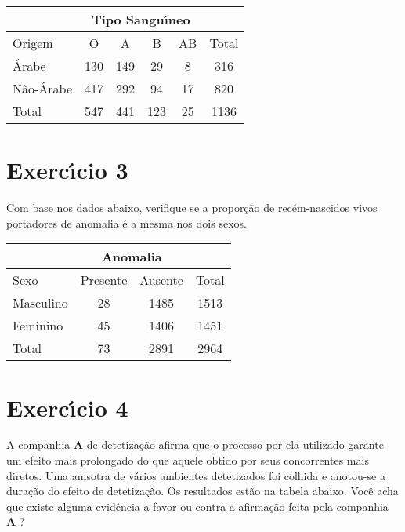 \documentclass[a4paper,11pt,twoside,openright]{report}
\begin{document}
\begin{center}
\begin{tabular}{l|llll|l}
\hline
\multicolumn{1}{l}{} & \multicolumn{4}{c}{Tipo Sangu\'{\i}neo} &  \\ 
\hline
Origem & \multicolumn{1}{c}{O} & \multicolumn{1}{c}{A} & \multicolumn{1}{c}{B} & \multicolumn{1}{c|}{AB} & \multicolumn{1}{c}{Total} \\ 
\hline
\'{A}rabe & \multicolumn{1}{c}{130} & \multicolumn{1}{c}{149} & \multicolumn{1}{c}{29} & \multicolumn{1}{c|}{8} & \multicolumn{1}{c}{316} \\ 
N\~{a}o-\'{A}rabe & \multicolumn{1}{c}{417} & \multicolumn{1}{c}{292} & \multicolumn{1}{c}{94} & \multicolumn{1}{c|}{17} & \multicolumn{1}{c}{820} \\ 
\hline
Total & \multicolumn{1}{c}{547} & \multicolumn{1}{c}{441} & \multicolumn{1}{c}{123} & \multicolumn{1}{c|}{25} & \multicolumn{1}{c}{1136} \\ 
\hline
\end{tabular}
\end{center}
 

\section*{Exerc\'{\i}cio 3} 
\hspace{0.5cm}Com base nos dados abaixo, verifique se a propor\c{c}\~{a}o de rec\'{e}m-nascidos vivos portadores de anomalia \'{e} a mesma nos dois sexos.

\begin{center}
\begin{tabular}{l|ll|l}
\hline
\multicolumn{1}{l}{} & \multicolumn{2}{c}{Anomalia} &  \\ 
\hline
Sexo & \multicolumn{1}{c}{Presente} & \multicolumn{1}{c|}{Ausente} & \multicolumn{1}{c}{Total} \\ 
\hline
Masculino & \multicolumn{1}{c}{28} & \multicolumn{1}{c|}{1485} & \multicolumn{1}{c}{1513} \\ 
Feminino & \multicolumn{1}{c}{45} & \multicolumn{1}{c|}{1406} & \multicolumn{1}{c}{1451} \\ 
\hline
Total & \multicolumn{1}{c}{73} & \multicolumn{1}{c|}{2891} & \multicolumn{1}{c}{2964} \\ 
\hline
\end{tabular}
\end{center}


\section*{Exerc\'{\i}cio 4}
\hspace{0.5cm}A companhia \textbf{A} de detetiza\c{c}\~{a}o afirma que o processo por ela utilizado garante um efeito mais prolongado do que 
aquele obtido por seus concorrentes mais diretos. Uma amsotra de v\'{a}rios ambientes detetizados foi colhida e anotou-se a dura\c{c}\~{a}o do efeito
 de detetiza\c{c}\~{a}o. Os resultados est\~{a}o na tabela abaixo. Voc\^{e} acha que existe alguma evid\^{e}ncia a favor ou contra a afirma\c{c}\~{a}o 
feita pela companhia \textbf{A} ?
\end{document}

